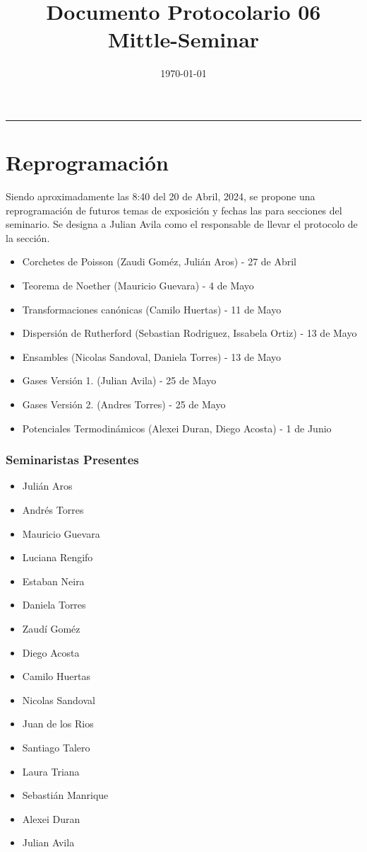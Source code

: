 \documentclass{article}
\title{\textbf{Documento Protocolario 06}\\ \small{Mittle-Seminar}}
\date{\today}
\theoremstyle{definition}
\begin{document}
\maketitle
\thispagestyle{fancy}
\hrule

\section{Reprogramación}
Siendo aproximadamente las 8:40 del 20 de Abril, 2024, se propone una reprogramación de futuros temas de exposición y fechas las para secciones del seminario. Se designa a Julian Avila como el responsable de llevar el protocolo de la sección.

\begin{itemize}
	\item Corchetes de Poisson (Zaudi Goméz, Julián Aros) - 27 de Abril
	\item Teorema de Noether (Mauricio Guevara) - 4 de Mayo
	\item Transformaciones canónicas (Camilo Huertas) - 11 de Mayo
	\item Dispersión de Rutherford (Sebastian Rodriguez, Issabela Ortiz) - 13 de Mayo
	\item Ensambles (Nicolas Sandoval, Daniela Torres) - 13 de Mayo
	\item Gases Versión 1. (Julian Avila) - 25 de Mayo
	\item Gases Versión 2. (Andres Torres) - 25 de Mayo
	\item Potenciales Termodinámicos (Alexei Duran, Diego Acosta) - 1 de Junio
\end{itemize}

\subsubsection*{Seminaristas Presentes}
\begin{itemize}
	\item Julián Aros
	\item Andrés Torres
	\item Mauricio Guevara
	\item Luciana Rengifo
	\item Estaban Neira
	\item Daniela Torres
	\item Zaudí Goméz
	\item Diego Acosta
	\item Camilo Huertas
	\item Nicolas Sandoval
	\item Juan de los Rios
	\item Santiago Talero
	\item Laura Triana
	\item Sebastián Manrique
	\item Alexei Duran
	\item Julian Avila
\end{itemize}
\end{document}
